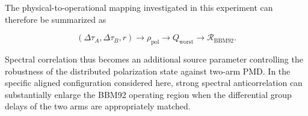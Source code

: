 The physical-to-operational mapping investigated in this experiment can
therefore be summarized as

\begin{equation}
\boxed{
\left(
\Delta\tau_A,
\Delta\tau_B,
r
\right)
\longrightarrow
\rho_{\mathrm{pol}}
\longrightarrow
Q_{\mathrm{worst}}
\longrightarrow
\mathcal{R}_{\mathrm{BBM92}}.
}
\label{eq:exp3_final_parameter_mapping}
\end{equation}

Spectral correlation thus becomes an additional source parameter controlling the
robustness of the distributed polarization state against two-arm PMD. In the
specific aligned configuration considered here, strong spectral anticorrelation
can substantially enlarge the BBM92 operating region when the differential group
delays of the two arms are appropriately matched.